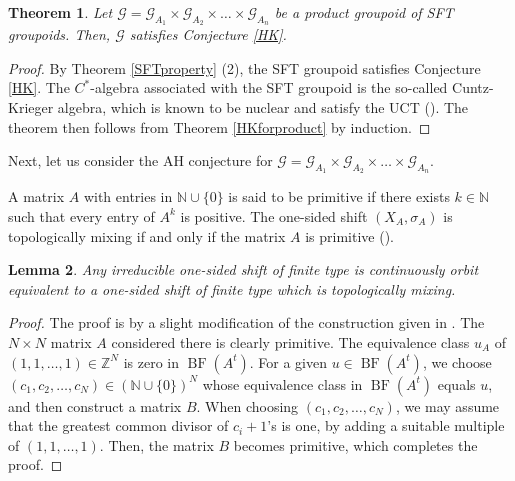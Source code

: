 \documentclass[11pt]{article}
\newtheorem{theorem}{Theorem}[section]
\newtheorem{lemma}[theorem]{Lemma}
\theoremstyle{definition}
\numberwithin{equation}{section}
\newcommand{\BF}{\operatorname{BF}}
\newcommand{\G}{\mathcal{G}}
\newcommand{\N}{\mathbb{N}}
\newcommand{\Z}{\mathbb{Z}}
\begin{document}
\begin{theorem}\label{prodSFTHK}
Let $\G=\G_{A_1}\times\G_{A_2}\times\dots\times\G_{A_n}$ be 
a product groupoid of SFT groupoids. 
Then, $\G$ satisfies Conjecture \ref{HK}. 
\end{theorem}
\begin{proof}
By Theorem \ref{SFTproperty} (2), 
the SFT groupoid satisfies Conjecture \ref{HK}. 
The $C^*$-algebra associated with the SFT groupoid is 
the so-called Cuntz-Krieger algebra, 
which is known to be nuclear and satisfy the UCT (\cite{CK80Invent}). 
The theorem then follows from Theorem \ref{HKforproduct} by induction. 
\end{proof}

Next, let us consider the AH conjecture 
for $\G=\G_{A_1}\times\G_{A_2}\times\dots\times\G_{A_n}$. 

A matrix $A$ with entries in $\N\cup\{0\}$ is said to be primitive 
if there exists $k\in\N$ such that every entry of $A^k$ is positive. 
The one-sided shift $(X_A,\sigma_A)$ is topologically mixing 
if and only if the matrix $A$ is primitive (\cite[Proposition 4.5.10]{LM}). 

\begin{lemma}
Any irreducible one-sided shift of finite type is 
continuously orbit equivalent to a one-sided shift of finite type 
which is topologically mixing. 
\end{lemma}
\begin{proof}
The proof is by a slight modification of 
the construction given in \cite[Lemma 3.7]{MM14Kyoto}. 
The $N\times N$ matrix $A$ considered there is clearly primitive. 
The equivalence class $u_A$ of $(1,1,\dots,1)\in\Z^N$ is zero in $\BF(A^t)$. 
For a given $u\in\BF(A^t)$, we choose $(c_1,c_2,\dots,c_N)\in(\N\cup\{0\})^N$ 
whose equivalence class in $\BF(A^t)$ equals $u$, 
and then construct a matrix $B$. 
When choosing $(c_1,c_2,\dots,c_N)$, we may assume that 
the greatest common divisor of $c_i{+}1$'s is one, 
by adding a suitable multiple of $(1,1,\dots,1)$. 
Then, the matrix $B$ becomes primitive, 
which completes the proof. 
\end{proof}
\end{document}

